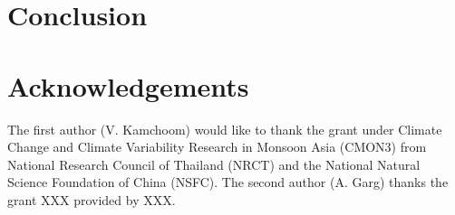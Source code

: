 \documentclass[12pt,a4paper]{article}
\begin{document}
	\section{Conclusion}
	
	\section*{Acknowledgements}
	
	The first author (V. Kamchoom) would like to thank the grant under Climate Change and Climate Variability Research in Monsoon Asia (CMON3) from National Research Council of Thailand (NRCT) and the National Natural Science Foundation of China (NSFC). The second author (A. Garg) thanks the grant XXX provided by XXX. 
	
	
	
	
\end{document}
